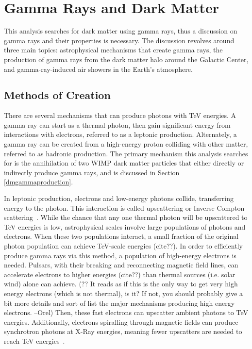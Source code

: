 \cleartooddpage[\thispagestyle{empty}]
\chapter{Gamma Rays and Dark Matter}

This analysis searches for dark matter using gamma rays, thus a discussion on gamma rays and their properties is necessary.
The discussion revolves around three main topics: astrophysical mechanisms that create gamma rays, the production of gamma rays from the dark matter halo around the Galactic Center, and gamma-ray-induced air showers in the Earth's atmosphere.

\section{Methods of Creation}

  There are several mechanisms that can produce photons with TeV energies.
  A gamma ray can start as a thermal photon, then gain significant energy from interactions with electrons, referred to as a leptonic production.
  Alternately, a gamma ray can be created from a high-energy proton colliding with other matter, referred to as hadronic production.
  The primary mechanism this analysis searches for is the annihilation of two WIMP dark matter particles that either directly or indirectly produce gamma rays, and is discussed in Section \ref{dmgammaproduction}.

  In leptonic production, electrons and low-energy photons collide, transferring energy to the photon.
  This interaction is called upscattering or Inverse Compton scattering~\cite{compton_effect}.
  While the chance that any one thermal photon will be upscattered to TeV energies is low, astrophysical scales involve large populations of photons and electrons.
  When these two populations interact, a small fraction of the original photon population {\color{red}can achieve TeV-scale energies (cite??)}.
  In order to efficiently produce gamma rays via this method, a population of high-energy electrons is needed.
  Pulsars, with their breaking and reconnecting magnetic field lines, {\color{red}can accelerate electrons to higher energies (cite??)} than thermal sources (i.e. solar wind) alone can achieve.
  {\color{red}(?? It reads as if this is the only way to get very high energy electrons (which is not thermal), is it? If not, you should probably give a bit more details and sort of list the major mechanisms producing high energy electrons. --Orel)}
  Then, these fast electrons can upscatter ambient photons to TeV energies.
  Additionally, electrons spiralling through magnetic fields can produce synchrotron photons at X-Ray energies, meaning fewer upscatters are needed to reach TeV energies~\cite{self_compton}.

